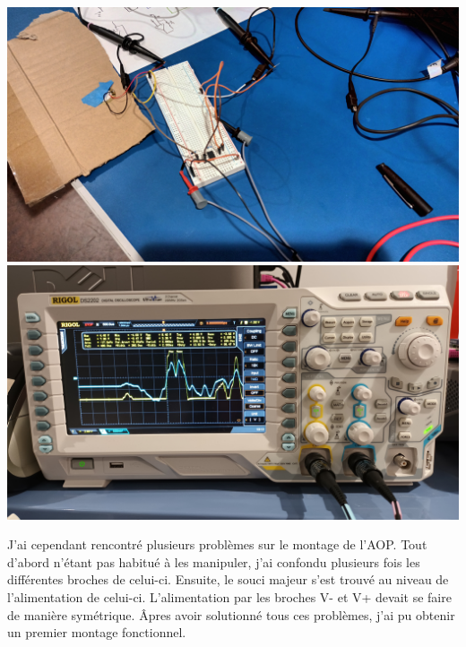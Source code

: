 \documentclass[12pt]{article}
\begin{document}
\begin{center}	
	\includegraphics[scale=0.08]{../img/montage_piezo_aop.jpg}
	\label{image3}
	\includegraphics[scale=0.08]{../img/sortie_osciloscope.jpg}
	\label{image4}
\end{center}
\newpage
J'ai cependant rencontré plusieurs problèmes sur le montage de l'AOP. Tout d'abord n'étant pas habitué 
à les manipuler, j'ai confondu plusieurs fois les différentes broches de celui-ci. Ensuite, le souci majeur 
s'est trouvé au niveau de l'alimentation de celui-ci. L'alimentation par les broches V- et V+ devait se faire 
de manière symétrique. 
Âpres avoir solutionné tous ces problèmes, j'ai pu obtenir un premier montage fonctionnel.
\end{document}
